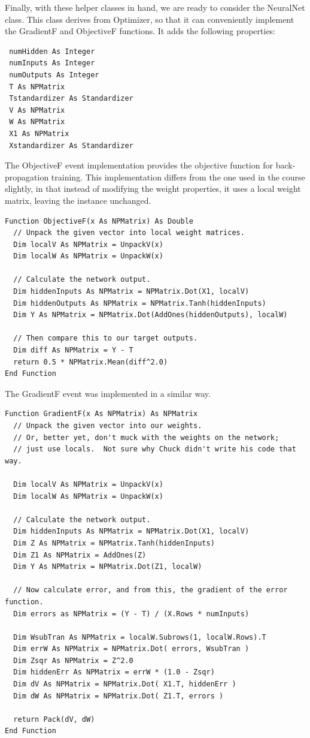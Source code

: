 \documentclass{article}
\begin{document}
Finally, with these helper classes in hand, we are ready to consider the NeuralNet class.  This class derives from Optimizer, so that it can conveniently implement the GradientF and ObjectiveF functions.  It adds the following properties:

\begin{lstlisting}
 numHidden As Integer
 numInputs As Integer
 numOutputs As Integer
 T As NPMatrix
 Tstandardizer As Standardizer
 V As NPMatrix
 W As NPMatrix
 X1 As NPMatrix
 Xstandardizer As Standardizer
\end{lstlisting}

The ObjectiveF event implementation provides the objective function for back-propagation training.  This implementation differs from the one used in the course slightly, in that instead of modifying the weight properties, it uses a local weight matrix, leaving the instance unchanged.

\begin{lstlisting}
Function ObjectiveF(x As NPMatrix) As Double
  // Unpack the given vector into local weight matrices.
  Dim localV As NPMatrix = UnpackV(x)
  Dim localW As NPMatrix = UnpackW(x)
  
  // Calculate the network output.
  Dim hiddenInputs As NPMatrix = NPMatrix.Dot(X1, localV)
  Dim hiddenOutputs As NPMatrix = NPMatrix.Tanh(hiddenInputs)
  Dim Y As NPMatrix = NPMatrix.Dot(AddOnes(hiddenOutputs), localW)
  
  // Then compare this to our target outputs.
  Dim diff As NPMatrix = Y - T
  return 0.5 * NPMatrix.Mean(diff^2.0)
End Function
\end{lstlisting}

The GradientF event was implemented in a similar way.

\begin{lstlisting}
Function GradientF(x As NPMatrix) As NPMatrix
  // Unpack the given vector into our weights.
  // Or, better yet, don't muck with the weights on the network;
  // just use locals.  Not sure why Chuck didn't write his code that way.
  
  Dim localV As NPMatrix = UnpackV(x)
  Dim localW As NPMatrix = UnpackW(x)
  
  // Calculate the network output.
  Dim hiddenInputs As NPMatrix = NPMatrix.Dot(X1, localV)
  Dim Z As NPMatrix = NPMatrix.Tanh(hiddenInputs)
  Dim Z1 As NPMatrix = AddOnes(Z)
  Dim Y As NPMatrix = NPMatrix.Dot(Z1, localW)
  
  // Now calculate error, and from this, the gradient of the error function.
  Dim errors as NPMatrix = (Y - T) / (X.Rows * numInputs)
  
  Dim WsubTran As NPMatrix = localW.Subrows(1, localW.Rows).T
  Dim errW As NPMatrix = NPMatrix.Dot( errors, WsubTran )
  Dim Zsqr As NPMatrix = Z^2.0
  Dim hiddenErr As NPMatrix = errW * (1.0 - Zsqr)
  Dim dV As NPMatrix = NPMatrix.Dot( X1.T, hiddenErr )
  Dim dW As NPMatrix = NPMatrix.Dot( Z1.T, errors )
   
  return Pack(dV, dW)
End Function
\end{lstlisting}
\end{document}
